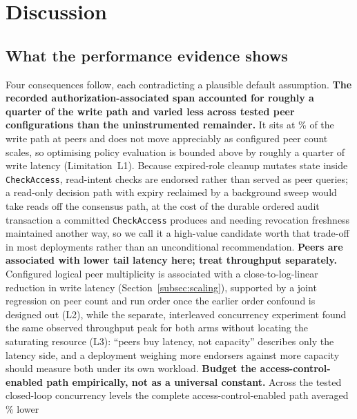 \documentclass[a4paper,fleqn]{cas-sc}
\begin{document}
\FloatBarrier
\section{Discussion}
\label{sec:discussion}

\subsection{What the performance evidence shows}
\label{subsec:implications}

Four consequences follow, each contradicting a plausible default
assumption. \textbf{The recorded authorization-associated span accounted
for roughly a quarter of the write path and varied less across tested
peer configurations than the uninstrumented remainder.} It sits at
\PartAccessPct\% of the write path at \ScaleMinPeers{} peers and does not
move appreciably as configured peer count scales, so optimising policy
evaluation is bounded above by roughly a quarter of write latency
(Limitation~L1). Because expired-role cleanup
mutates state inside \texttt{CheckAccess}, read-intent checks are endorsed
rather than served as peer queries; a read-only decision path with expiry
reclaimed by a background sweep would take reads off the consensus path, at
the cost of the durable ordered audit transaction a committed
\texttt{CheckAccess} produces and needing revocation freshness maintained
another way, so we call it a high-value candidate worth that trade-off in
most deployments rather than an unconditional recommendation.
\textbf{Peers are associated with lower tail latency here; treat
throughput separately.} Configured logical peer multiplicity is associated
with a close-to-log-linear reduction in write latency
(Section~\ref{subsec:scaling}), supported by a joint regression on peer
count and run order once the earlier order confound is designed out
(L2), while the separate, interleaved concurrency experiment found the
same observed throughput peak for both arms without locating the
saturating resource (L3): ``peers buy latency, not capacity'' describes
only the latency side, and a deployment weighing more endorsers against
more capacity should measure both under its own workload.
\textbf{Budget the access-control-enabled path empirically, not as a
universal constant.} Across the tested closed-loop concurrency levels the
complete access-control-enabled path averaged \OverheadMeanPct\% lower
\end{document}
